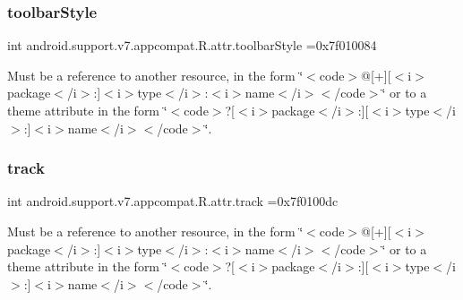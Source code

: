 \subsubsection{\texorpdfstring{toolbar\+Style}{toolbarStyle}}
{\footnotesize\ttfamily int android.\+support.\+v7.\+appcompat.\+R.\+attr.\+toolbar\+Style =0x7f010084\hspace{0.3cm}{\ttfamily [static]}}

Must be a reference to another resource, in the form \char`\"{}$<$code$>$@\mbox{[}+\mbox{]}\mbox{[}$<$i$>$package$<$/i$>$\+:\mbox{]}$<$i$>$type$<$/i$>$\+:$<$i$>$name$<$/i$>$$<$/code$>$\char`\"{} or to a theme attribute in the form \char`\"{}$<$code$>$?\mbox{[}$<$i$>$package$<$/i$>$\+:\mbox{]}\mbox{[}$<$i$>$type$<$/i$>$\+:\mbox{]}$<$i$>$name$<$/i$>$$<$/code$>$\char`\"{}. \mbox{\label{classandroid_1_1support_1_1v7_1_1appcompat_1_1R_1_1attr_a8d34459bf1b56730d9db07c0105fef49}} 
\subsubsection{\texorpdfstring{track}{track}}
{\footnotesize\ttfamily int android.\+support.\+v7.\+appcompat.\+R.\+attr.\+track =0x7f0100dc\hspace{0.3cm}{\ttfamily [static]}}

Must be a reference to another resource, in the form \char`\"{}$<$code$>$@\mbox{[}+\mbox{]}\mbox{[}$<$i$>$package$<$/i$>$\+:\mbox{]}$<$i$>$type$<$/i$>$\+:$<$i$>$name$<$/i$>$$<$/code$>$\char`\"{} or to a theme attribute in the form \char`\"{}$<$code$>$?\mbox{[}$<$i$>$package$<$/i$>$\+:\mbox{]}\mbox{[}$<$i$>$type$<$/i$>$\+:\mbox{]}$<$i$>$name$<$/i$>$$<$/code$>$\char`\"{}. \mbox{\label{classandroid_1_1support_1_1v7_1_1appcompat_1_1R_1_1attr_a41d5d117864ce88df8ccd7fb51d7f54d}} 
